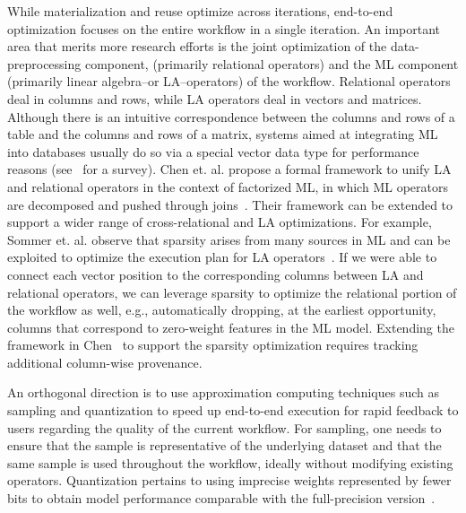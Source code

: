 \documentclass[11pt,dvipdfmx]{article}
\newcommand{\topic}[1]{\vspace{-3.5pt}\smallskip \smallskip \noindent{\bf #1.}}
\begin{document}
\topic{End-to-end optimization}
While materialization and reuse optimize across iterations, 
end-to-end optimization focuses on the entire workflow in a single iteration.
An important area that merits more research efforts is the joint optimization of the data-preprocessing component, (primarily relational operators) and the ML component (primarily linear algebra--or LA--operators) of the workflow. 
Relational operators deal in columns and rows, while LA operators deal in vectors and matrices. 
Although there is an intuitive correspondence between the columns and rows of a table and the columns and rows of a matrix, 
systems aimed at integrating ML into databases usually do so via a
special vector data type for performance reasons (see~\cite{kumar2017data} for a survey).
Chen et. al. propose a formal framework to unify LA and relational operators in the context of factorized ML, in which ML operators are decomposed and pushed through joins~\cite{chen2017towards}. 
Their framework can be extended to support a wider range of cross-relational and LA optimizations. 
For example, Sommer et. al. observe that sparsity arises from many sources in ML and can be exploited to optimize the execution plan for LA operators~\cite{sommer2019mnc}. 
If we were able to connect each vector position to the corresponding columns between LA and relational operators, 
we can leverage sparsity to optimize the relational portion of the workflow as well, 
e.g., automatically dropping, at the earliest opportunity, columns that correspond to zero-weight features in the ML model.
Extending the framework in Chen~\cite{chen2017towards} to support the sparsity optimization 
requires tracking additional column-wise provenance.



An orthogonal direction is to use approximation computing techniques 
such as sampling and quantization to speed up end-to-end execution 
for rapid feedback to users regarding the quality of the current workflow. 
For sampling, one needs to ensure that the sample is representative of the underlying dataset 
and that the same sample is used throughout the workflow, ideally without modifying existing operators.
Quantization pertains to using imprecise weights represented by fewer bits to obtain model performance comparable with the full-precision version~\cite{hubara2017quantized}.
\end{document}
